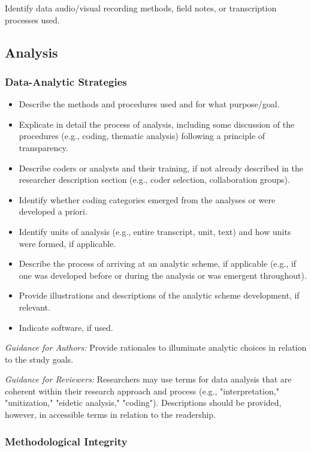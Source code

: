 \documentclass[acmsmall]{acmart}
\begin{document}
Identify data audio/visual recording methods, field notes, or transcription processes used.

\subsection{Analysis}

\subsubsection{Data-Analytic Strategies}

\begin{itemize}
    \item Describe the methods and procedures used and for what purpose/goal.
\item Explicate in detail the process of analysis, including some discussion of the procedures
(e.g., coding, thematic analysis) following a principle of transparency.
\item Describe coders or analysts and their training, if not already described in the researcher
description section (e.g., coder selection, collaboration groups).
\item Identify whether coding categories emerged from the analyses or were developed a priori.
\item Identify units of analysis (e.g., entire transcript, unit, text) and how units were formed,
if applicable.
\item Describe the process of arriving at an analytic scheme, if applicable (e.g., if one was
developed before or during the analysis or was emergent throughout).
\item Provide illustrations and descriptions of the analytic scheme development, if relevant.
\item Indicate software, if used.
\end{itemize}

\textit{Guidance for Authors:} Provide rationales to illuminate analytic choices in relation to the study goals.
\vspace{3mm}

\textit{Guidance for Reviewers:} Researchers may use terms for data analysis that are coherent within their research approach and process (e.g., "interpretation," "unitization," "eidetic analysis," "coding").
Descriptions should be provided, however, in accessible terms in relation to the readership.

\subsubsection{Methodological Integrity}
\end{document}
